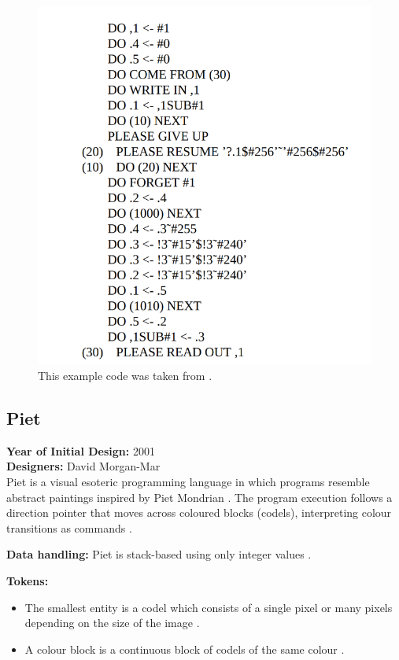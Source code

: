 \documentclass{article}
\begin{document}
\begin{figure}[H]
    \centering
    \includegraphics[width=0.5\linewidth]{Screenshot From 2025-02-18 08-57-51.png}
    \caption{This example code was taken from \cite{Woods}.}
\end{figure}


\subsection{Piet}
\textbf{Year of Initial Design:} 2001\\
\textbf{Designers:} David Morgan-Mar\\
Piet is a visual esoteric programming language in which programs resemble abstract paintings inspired by Piet Mondrian \cite{EsolangsPiet}. The program execution follows a direction pointer that moves across coloured blocks (codels), interpreting colour transitions as commands \cite{MorganMar}. 

\textbf{Data handling:}  
Piet is stack-based using only integer values \cite{MorganMar}.

\textbf{Tokens:}
\begin{itemize}
    \item The smallest entity is a codel which consists of a single pixel or many pixels depending on the size of the image \cite{Moosleitner}.
\end{itemize}
\begin{itemize}
    \item A colour block is a continuous block of codels of the same colour \cite{Moosleitner}.
\end{itemize}
\end{document}
